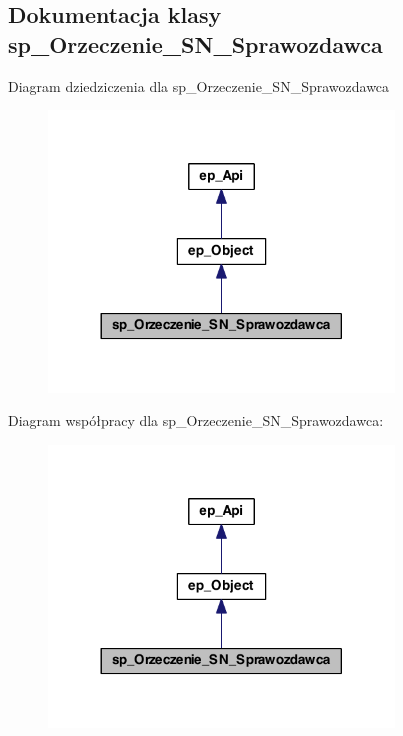 \hypertarget{classsp___orzeczenie___s_n___sprawozdawca}{\subsection{Dokumentacja klasy sp\-\_\-\-Orzeczenie\-\_\-\-S\-N\-\_\-\-Sprawozdawca}
\label{classsp___orzeczenie___s_n___sprawozdawca}
}


Diagram dziedziczenia dla sp\-\_\-\-Orzeczenie\-\_\-\-S\-N\-\_\-\-Sprawozdawca\nopagebreak
\begin{figure}[H]
\begin{center}
\leavevmode
\includegraphics[width=260pt]{classsp___orzeczenie___s_n___sprawozdawca__inherit__graph}
\end{center}
\end{figure}


Diagram współpracy dla sp\-\_\-\-Orzeczenie\-\_\-\-S\-N\-\_\-\-Sprawozdawca\-:\nopagebreak
\begin{figure}[H]
\begin{center}
\leavevmode
\includegraphics[width=260pt]{classsp___orzeczenie___s_n___sprawozdawca__coll__graph}
\end{center}
\end{figure}
